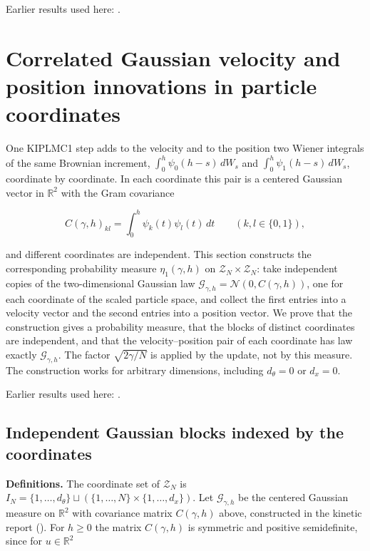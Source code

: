 \documentclass[11pt,a4paper]{report}
\begin{document}
Earlier results used here: \cite[Section~3.1.1]{LangevinLean2026Kinetic}.
\section{\texorpdfstring{Correlated Gaussian velocity and position innovations in particle coordinates}{Correlated Gaussian velocity and position innovations in particle coordinates}}
\label{proof-module-KIPLMC-Noise-lean}


One KIPLMC1 step adds to the velocity and to the position two Wiener integrals of the same Brownian increment, \(\int_0^h\psi_0(h-s)\,dW_s\) and \(\int_0^h\psi_1(h-s)\,dW_s\), coordinate by coordinate. In each coordinate this pair is a centered Gaussian vector in \(\mathbb R^2\) with the Gram covariance


\[C(\gamma,h)_{kl}=\int_0^h\psi_k(t)\psi_l(t)\,dt\qquad(k,l\in\{0,1\}),\]


and different coordinates are independent. This section constructs the corresponding probability measure \(\eta_1(\gamma,h)\) on \(\mathcal Z_N\times\mathcal Z_N\): take independent copies of the two-dimensional Gaussian law \(\mathcal G_{\gamma,h}=\mathcal N(0,C(\gamma,h))\), one for each coordinate of the scaled particle space, and collect the first entries into a velocity vector and the second entries into a position vector. We prove that the construction gives a probability measure, that the blocks of distinct coordinates are independent, and that the velocity–position pair of each coordinate has law exactly \(\mathcal G_{\gamma,h}\). The factor \(\sqrt{2\gamma/N}\) is applied by the update, not by this measure. The construction works for arbitrary dimensions, including \(d_\theta=0\) or \(d_x=0\).



Earlier results used here: \cite[Section~3.26]{LangevinLean2026Kinetic}.
\subsection{\texorpdfstring{Independent Gaussian blocks indexed by the coordinates}{Independent Gaussian blocks indexed by the coordinates}}
\label{report-step-KIPLMC-Noise-lean-1}


\textbf{Definitions.} The coordinate set of \(\mathcal Z_N\) is \(I_N=\{1,\dots,d_\theta\}\sqcup(\{1,\dots,N\}\times\{1,\dots,d_x\})\). Let \(\mathcal G_{\gamma,h}\) be the centered Gaussian measure on \(\mathbb R^2\) with covariance matrix \(C(\gamma,h)\) above, constructed in the kinetic report (\cite[Section~3.26.3]{LangevinLean2026Kinetic}). For \(h\ge0\) the matrix \(C(\gamma,h)\) is symmetric and positive semidefinite, since for \(u\in\mathbb R^2\)
\end{document}
